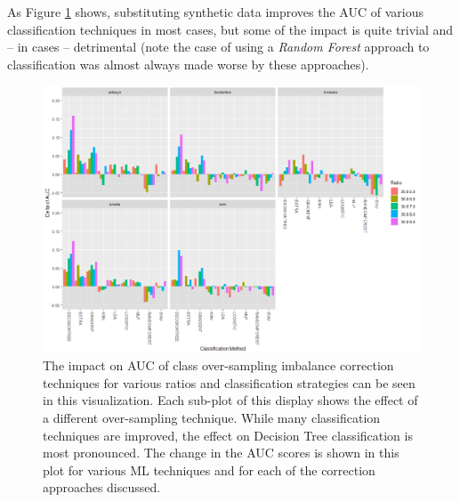 \documentclass[letterpaper, notitlepage]{report}
\begin{document}
As Figure \ref{fig:imbalance} shows, substituting synthetic data improves the AUC of various classification techniques in most cases, but some of the impact is quite trivial and -- in cases -- detrimental (note the case of using a \textit{Random Forest} approach to classification was almost always made worse by these approaches). 
%
%
%
%
%
%
\begin{figure}[hp]
	\centering
	\includegraphics[width=\linewidth]{./figures/imbalance.png}
	\caption[Class imbalance correction techniques]{The impact on AUC of class over-sampling imbalance correction techniques for various ratios and classification strategies can be seen in this visualization. Each sub-plot of this display shows the effect of a different over-sampling technique. While many classification techniques are improved, the effect on Decision Tree classification is most pronounced. The change in the AUC scores is shown in this plot for various ML techniques and for each of the correction approaches discussed.}
	\label{fig:imbalance}
\end{figure}
\end{document}
